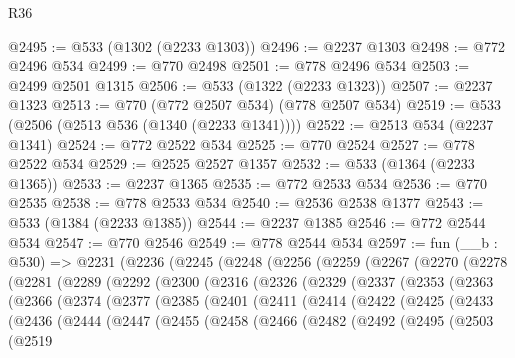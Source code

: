 \begin{lexlean}{R36}
\begin{coremodule}
@2495 := @533 (@1302 (@2233 @1303))
@2496 := @2237 @1303
@2498 := @772 @2496 @534
@2499 := @770 @2498
@2501 := @778 @2496 @534
@2503 := @2499 @2501 @1315
@2506 := @533 (@1322 (@2233 @1323))
@2507 := @2237 @1323
@2513 := @770 (@772 @2507 @534) (@778 @2507 @534)
@2519 := @533 (@2506 (@2513 @536 (@1340 (@2233 @1341))))
@2522 := @2513 @534 (@2237 @1341)
@2524 := @772 @2522 @534
@2525 := @770 @2524
@2527 := @778 @2522 @534
@2529 := @2525 @2527 @1357
@2532 := @533 (@1364 (@2233 @1365))
@2533 := @2237 @1365
@2535 := @772 @2533 @534
@2536 := @770 @2535
@2538 := @778 @2533 @534
@2540 := @2536 @2538 @1377
@2543 := @533 (@1384 (@2233 @1385))
@2544 := @2237 @1385
@2546 := @772 @2544 @534
@2547 := @770 @2546
@2549 := @778 @2544 @534
@2597 := fun (__b : @530) =>
  @2231
    (@2236
      (@2245
        (@2248
          (@2256
            (@2259
              (@2267
                (@2270
                  (@2278
                    (@2281
                      (@2289
                        (@2292
                          (@2300
                            (@2316
                              (@2326
                                (@2329
                                  (@2337
                                    (@2353
                                      (@2363
                                        (@2366
                                          (@2374
                                            (@2377
                                              (@2385
                                                (@2401
                                                  (@2411
                                                    (@2414
                                                      (@2422
                                                        (@2425
                                                          (@2433
                                                            (@2436
                                                              (@2444
                                                                (@2447
                                                                  (@2455
                                                                    (@2458
                                                                      (@2466
                                                                        (@2482
                                                                          (@2492
                                                                            (@2495
                                                                              (@2503
                                                                                (@2519

\end{coremodule}
\end{lexlean}
